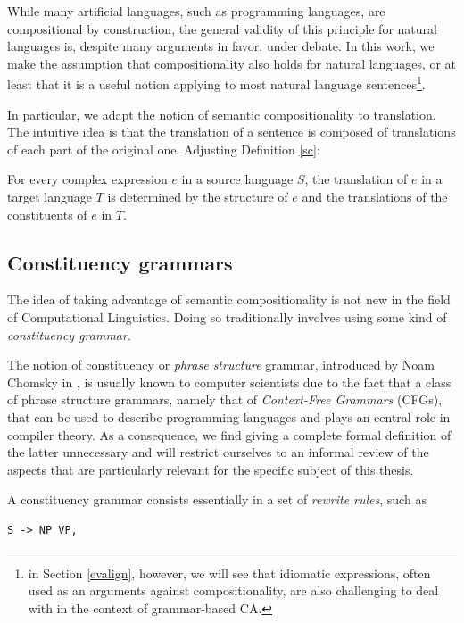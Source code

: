 While many artificial languages, such as programming languages, are compositional by construction, the general validity of this principle for natural languages is, despite many arguments in favor, under debate. 
In this work, we make the assumption that compositionality also holds for natural languages, or at least that it is a useful notion applying to most natural language sentences\footnote{in Section \ref{evalign}, however, we will see that idiomatic expressions, often used as an arguments against compositionality, are also challenging to deal with in the context of grammar-based CA.}. \smallskip

In particular, we adapt the notion of semantic compositionality to translation. 
The intuitive idea is that the translation of a sentence is composed of translations of each part of the original one. Adjusting Definition \ref{sc}:

\begin{definition}
    For every complex expression $e$ in a source language $S$, the translation of $e$ in a target language $T$ is determined by the structure of $e$ and the translations of the constituents of $e$ in $T$.
\end{definition}

\subsection{Constituency grammars}
The idea of taking advantage of semantic compositionality is not new in the field of Computational Linguistics. 
Doing so traditionally involves using some kind of \textit{constituency grammar}. \smallskip

The notion of constituency or \textit{phrase structure} grammar, introduced by Noam Chomsky in \cite{chomsky}, is usually known to computer scientists due to the fact that a class of phrase structure grammars, namely that of \textit{Context-Free Grammars} (CFGs), that can be used to describe programming languages and plays an central role in compiler theory. 
As a consequence, we find giving a complete formal definition of the latter unnecessary and will restrict ourselves to an informal review of the aspects that are particularly relevant for the specific subject of this thesis. \smallskip

A constituency grammar consists essentially in a set of \textit{rewrite rules}, such as 

\begin{lstlisting}[frame=none]
    S -> NP VP,
\end{lstlisting}


